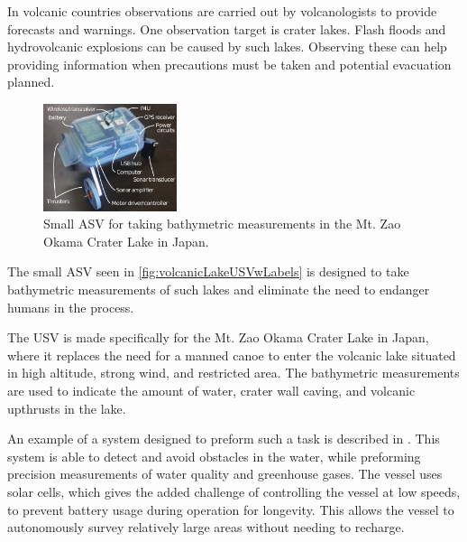 In volcanic countries observations are carried out by volcanologists to provide forecasts and warnings. One observation target is crater lakes. Flash floods and hydrovolcanic explosions can be caused by such lakes. Observing these can help providing information when precautions must be taken and potential evacuation planned.\cite{AWatanabe}
%
\begin{figure}[H]
  \includegraphics[width=0.35\textwidth]{figures/volcanicLakeUSVwLabels.pdf}
  \caption{Small ASV for taking bathymetric measurements in the Mt. Zao Okama Crater Lake in Japan.\cite{AWatanabe}}
  \label{fig:volcanicLakeUSVwLabels}
\end{figure}
\vspace{-6mm}
%
The small ASV seen in \autoref{fig:volcanicLakeUSVwLabels} is designed to take bathymetric measurements of such lakes and eliminate the need to endanger humans in the process.\cite{AWatanabe}

The USV is made specifically for the Mt. Zao Okama Crater Lake in Japan, where it replaces the need for a manned canoe to enter the volcanic lake situated in high
altitude, strong wind, and restricted area. The bathymetric measurements are used to indicate the amount of water, crater wall caving, and volcanic upthrusts in the lake.\cite{AWatanabe}

An example of a system designed to preform such a task is described in \cite{asv_solar}.
This system is able to detect and avoid obstacles in the water, while preforming precision measurements of water quality and greenhouse gases. 
The vessel uses solar cells, which gives the added challenge of controlling the vessel at low speeds, to prevent battery usage during operation for longevity. 
This allows the vessel to autonomously survey relatively large areas without needing to recharge. 

